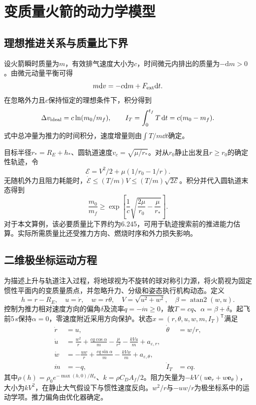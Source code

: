 \section{变质量火箭的动力学模型}
\subsection{理想推进关系与质量比下界}
设火箭瞬时质量为$m$，有效排气速度大小为$c$，时间微元内排出的质量为$-\mathrm dm>0$。由微元动量平衡可得
\begin{equation}m\mathrm dv=-c\mathrm dm+F_{\rm ext}\mathrm dt.\end{equation}
在忽略外力且$c$保持恒定的理想条件下，积分得到
\begin{equation}\Delta v_{\rm ideal}=c\ln(m_0/m_f),\qquad I_T=\int_0^{t_f}T\,\mathrm d t=c(m_0-m_f).\label{eq:tsiolkovsky}\end{equation}
式中总冲量为推力的时间积分，速度增量则由$\int T/m\dd t$确定。

目标半径$r_*=R_E+h_*$、圆轨道速度$v_c=\sqrt{\mu/r_*}$。对从$r_0$静止出发且$r\ge r_0$的确定性轨迹，令
\begin{equation}\mathcal E=V^2/2+\mu(1/r_0-1/r).\end{equation}
无随机外力且阻力耗能时，$\dot{\mathcal E}\le(T/m)V\le(T/m)\sqrt{2\mathcal E}$。积分并代入圆轨道末态得到
\begin{equation}\frac{m_0}{m_f}\ge\exp\left[\frac1c\sqrt{\frac{2\mu}{r_0}-\frac{\mu}{r_*}}\right].\end{equation}
对于本文算例，该必要质量比下界约为6.245，可用于轨迹搜索前的推进能力估算。实际所需质量比还受推力方向、燃烧时序和外力损失影响。

\subsection{二维极坐标运动方程}
为描述上升与轨道注入过程，将地球视为不旋转的球对称引力源，将火箭视为固定惯性平面内的变质量质点，并忽略升力、分级和姿态执行机构动态。定义
\begin{equation}h=r-R_E,\quad u=\dot r,\quad w=r\dot\theta,\quad V=\sqrt{u^2+w^2},\quad\beta=\operatorname{atan2}(w,u).\end{equation}
控制为推力相对速度方向的偏角$\delta$及流率$q=-\dot m\ge0$，故$T=cq$、$\alpha=\beta+\delta$。起飞前5\,s保持$\alpha=0$，零速度附近采用方向保护。状态$x=(r,\theta,u,w,m,I_T)^{\mathsf T}$满足
\begin{equation}
\begin{aligned}
\dot r&=u,&\dot\theta&=w/r,\\
\dot u&=\frac{w^2}{r}+\frac{cq\cos\alpha}{m}-\frac{\mu}{r^2}-\frac{kVu}{m}+a_{\varepsilon,r},\\
\dot w&=-\frac{uw}{r}+\frac{cq\sin\alpha}{m}-\frac{kVw}{m}+a_{\varepsilon,\theta},\\
\dot m&=-q,&\dot I_T&=cq .
\end{aligned}\label{eq:dynamics}
\end{equation}
其中$\rho(h)=\rho_0e^{-\max(h,0)/H_a}$、$k=\rho C_DA_f/2$。阻力矢量为$-kV(u\bm e_r+w\bm e_\theta)$，大小为$kV^2$，在静止大气假设下与惯性速度反向。$w^2/r$与$-uw/r$为极坐标系中的运动学项。推力偏角由优化器确定。

